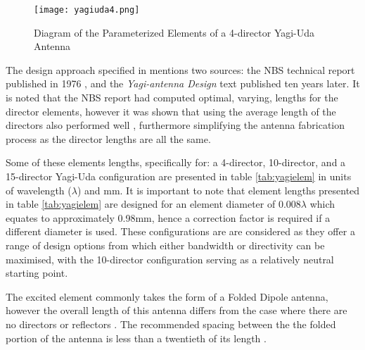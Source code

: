 \documentclass[10pt,twocolumn,hidelinks]{witseiepaper}
\begin{document}
\begin{figure}
    \texttt{[image: yagiuda4.png]}
    \caption{Diagram of the Parameterized Elements of a 4-director Yagi-Uda Antenna}
    \label{yagi4}
\end{figure}

The design approach specified in \cite[p. 69]{clark_fourie_2002} mentions
two sources: the NBS technical report published in 1976 \cite{NBS}, and the
\textit{Yagi-antenna Design} \cite{lawson} text published ten years later.
It is noted that the NBS report had computed optimal, varying, lengths for
the director elements, however it was shown that using the average length
of the directors also performed well \cite{lawson}, furthermore simplifying
the antenna fabrication process as the director lengths are all the same.

Some of these elements lengths, specifically for: a 4-director,
10-director, and a 15-director Yagi-Uda configuration are presented in
table \ref{tab:yagielem} in units of wavelength ($\lambda$) and mm. It is
important to note that element lengths presented in table
\ref{tab:yagielem} are designed for an element diameter of 0.008$\lambda$
which equates to approximately 0.98mm, hence a correction factor is
required if a different diameter is used. These configurations are are
considered as they offer a range of design options from which either
bandwidth or directivity can be maximised, with the 10-director
configuration serving as a relatively neutral starting point.

The excited element commonly takes the form of a Folded Dipole antenna,
however the overall length of this antenna differs from the case where
there are no directors or reflectors \cite[p. 69]{clark_fourie_2002}. The
recommended spacing between the the folded portion of the antenna is less
than a twentieth of its length \cite[p. 506]{balanis2005antenna}.
\end{document}

